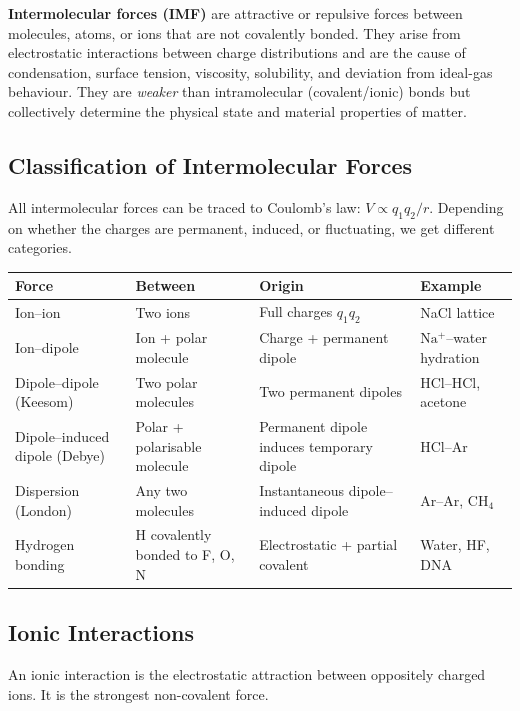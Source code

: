 \documentclass[12pt,a4paper]{article}
\begin{document}
\begin{tcolorbox}[defbox]
\textbf{Intermolecular forces (IMF)} are attractive or repulsive forces between molecules, atoms, or ions that are not covalently bonded. They arise from electrostatic interactions between charge distributions and are the cause of condensation, surface tension, viscosity, solubility, and deviation from ideal-gas behaviour. They are \emph{weaker} than intramolecular (covalent/ionic) bonds but collectively determine the physical state and material properties of matter.
\end{tcolorbox}

\subsection{Classification of Intermolecular Forces}
All intermolecular forces can be traced to Coulomb's law: $V \propto q_1 q_2 / r$. Depending on whether the charges are permanent, induced, or fluctuating, we get different categories.

\begin{tabularx}{\linewidth}{|B{2.8cm}|Y|Y|Y|}
\hline
\textbf{Force} & \textbf{Between} & \textbf{Origin} & \textbf{Example} \\
\hline
Ion--ion & Two ions & Full charges $q_1q_2$ & NaCl lattice \\
\hline
Ion--dipole & Ion + polar molecule & Charge + permanent dipole & $\mathrm{Na^+}$--water hydration \\
\hline
Dipole--dipole (Keesom) & Two polar molecules & Two permanent dipoles & HCl--HCl, acetone \\
\hline
Dipole--induced dipole (Debye) & Polar + polarisable molecule & Permanent dipole induces temporary dipole & HCl--Ar \\
\hline
Dispersion (London) & Any two molecules & Instantaneous dipole--induced dipole & Ar--Ar, $\mathrm{CH_4}$ \\
\hline
Hydrogen bonding & H covalently bonded to F, O, N & Electrostatic + partial covalent & Water, HF, DNA \\
\hline
\end{tabularx}

\subsection{Ionic Interactions}
An ionic interaction is the electrostatic attraction between oppositely charged ions. It is the strongest non-covalent force.
\end{document}
